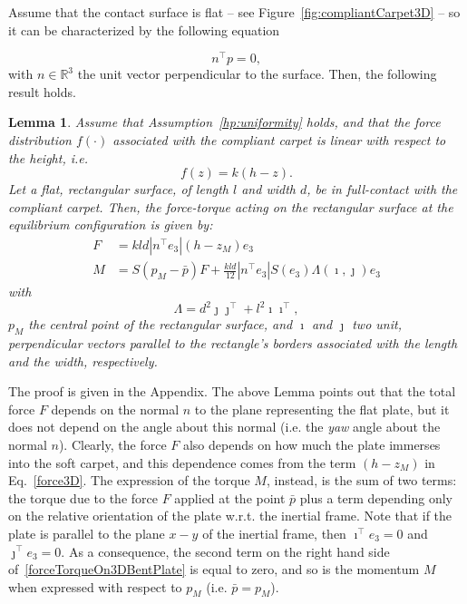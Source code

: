 \documentclass{article}
\newtheorem{boldLemma}{\bf{Lemma}}
\begin{document}
Assume that the contact surface is flat -- see Figure~\ref{fig:compliantCarpet3D} -- so it can be characterized by the following equation

\begin{equation}
\label{distributionPlane}
n^\top p = 0,
\end{equation} 
with $n \in \mathbb{R}^3$ the unit vector perpendicular to the  surface.
Then, the following result holds. 

\begin{boldLemma}
\label{lemma3D}
Assume that Assumption~\ref{hp:uniformity} holds, and that the force distribution $f(\cdot)$ associated with the compliant carpet  is linear with respect to the height, i.e.
\begin{equation}
\label{distributionLinear3D}
f(z) = k(h-z).
\end{equation}
Let a flat, rectangular surface, of length $l$ and width $d$, be in full-contact with the compliant carpet. Then, the force-torque acting on the  rectangular surface at the equilibrium configuration is given by: 
\begin{subequations}
\label{forceTorqueOn3DBentPlate}
    \begin{alignat}{2}
\label{force3D}
F &= kld|n^\top e_3|\left(h-z_M \right)e_3 \\
\label{torque3D}
M &= S(p_M - \bar{p})F + \frac{kld}{12}|n^\top e_3|S(e_3)\Lambda(\imath,\jmath)e_3 
    \end{alignat}
\end{subequations}
with 
\begin{equation}
\Lambda = d^2 \jmath \jmath^\top + l^2 \imath \imath^\top ,
\end{equation}
 $p_M$  the central point of the rectangular surface,  
and $\imath$ and 
$\jmath$ two unit, perpendicular vectors parallel to the rectangle's borders associated with the length and the width, respectively.
\end{boldLemma}

The proof is given in the Appendix. The above Lemma points out that the total force $F$ depends on the normal $n$ to the plane representing the flat plate, but it does not depend on the angle about this normal (i.e. the \emph{yaw} angle about the normal $n$). Clearly, the force $F$ also depends on how much the  plate immerses into the soft carpet, and this dependence comes from the term $(h-z_M)$ in Eq.~\eqref{force3D}. The expression of the torque $M$, instead, is the sum of two terms: the torque due to the force $F$ applied at the point  $\bar{p}$ plus a term  depending only on the relative orientation of the plate w.r.t. the inertial frame. Note that if the plate is parallel to the plane $x-y$ of the inertial frame, then $\imath^\top e_3 = 0$ and 
$\jmath^\top e_3 = 0$. As a consequence, the second term on the right hand side of~\eqref{forceTorqueOn3DBentPlate} is equal to zero, and so is the momentum $M$ when expressed with respect to $p_M$ (i.e. $\bar{p}=p_M$). 
\end{document}
